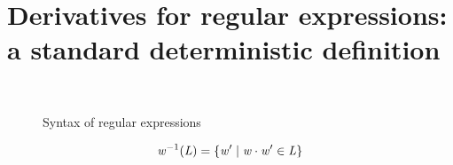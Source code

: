 \section{Derivatives for regular expressions: a standard deterministic definition}\label{regExp}

\begin{figure}[h]
 \begin{small}
  \begin{center}
   \begin{grammar}
     \\
   \end{grammar}
  \end{center}
 \end{small}
 \caption{Syntax of regular expressions}
 \label{regExpSyn}
\end{figure}

\begin{definition}
 \[
  \mathit {w}^{-1}(\mathit {L}) = \{ \mathit {w}' \mid \mathit {w}\mathbin{\cdot}\mathit {w}'\in\mathit {L} \}
 \]
\end{definition}

